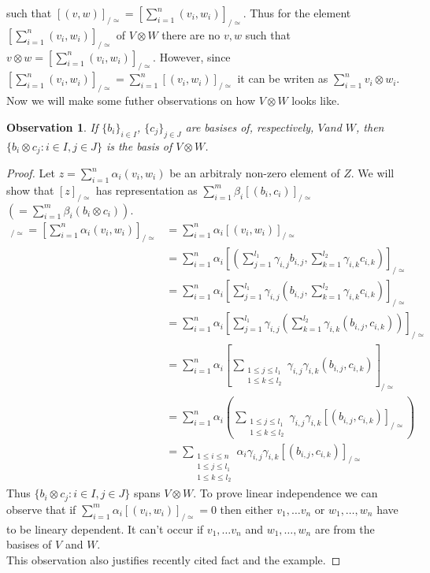 \documentclass[a4paper]{article}
\newtheorem{observation}{Observation}
\begin{document}
such that $ [(v,w)]_{/\simeq} = \left[\displaystyle\sum^n_{i=1}(v_i,w_i)\right]_{/\simeq}$.
Thus for the element $\left[\displaystyle\sum^n_{i=1}(v_i,w_i)\right]_{/\simeq}$ of $V\otimes W$
there are no $v, w$ such that $v \otimes w = \left[\displaystyle\sum^n_{i=1}(v_i,w_i)\right]_{/\simeq}$.
However, since $\left[\displaystyle\sum^n_{i=1}(v_i,w_i)\right]_{/\simeq} =
\displaystyle\sum^n_{i=1}[(v_i,w_i)]_{/\simeq}$ it can be writen as
$\displaystyle\sum^n_{i=1}v_i \otimes w_i$. \\
Now we will make some futher observations on how $V \otimes W$ looks like.
\begin{observation}
\label{observation:1}
If $\{b_i\}_{i \in I}$, $\{c_j\}_{j \in J}$ are basises of, respectively, $V$and $W$,
then $\{b_i \otimes c_j : i \in I, j \in J\}$ is the basis of $V \otimes W$.
\end{observation}
\begin{proof}
Let $z = \displaystyle\sum^n_{i = 1}\alpha_i(v_i,w_i)$ be an arbitraly non-zero element of $Z$. We will show
that $[z]_{/\simeq}$ has representation as $\displaystyle\sum^m_{i = 1}\beta_i [(b_i,c_i)]_{/\simeq}$
$\left(=\displaystyle\sum^m_{i = 1}\beta_i(b_i \otimes c_i)\right)$.
\begin{align*}
[z]_{/\simeq} = \left[\sum^n_{i = 1}\alpha_i(v_i,w_i)\right]_{/\simeq} &=
\sum^n_{i = 1}\alpha_i[(v_i,w_i)]_{/\simeq} \\
&= \sum^n_{i = 1}\alpha_i\left[\left(\sum^{l_1}_{j=1}\gamma_{i,j}b_{i,j},
\sum^{l_2}_{k=1}\gamma_{i,k}c_{i,k}\right)\right]_{/\simeq} \\
&= \sum^n_{i = 1}\alpha_i\left[\sum^{l_1}_{j=1}\gamma_{i,j}\left(b_{i,j},
\sum^{l_2}_{k=1}\gamma_{i,k}c_{i,k}\right)\right]_{/\simeq} \\
&= \sum^n_{i = 1}\alpha_i\left[\sum^{l_1}_{j=1}\gamma_{i,j}\left(\sum^{l_2}_{k=1}\gamma_{i,k}
\left(b_{i,j},c_{i,k}\right)\right)\right]_{/\simeq} \\
&= \sum^n_{i = 1}\alpha_i\left[\sum_{\substack{1 \leq j \leq l_1 \\ 1 \leq k \leq l_2}}
\gamma_{i,j}\gamma_{i,k}(b_{i,j}, c_{i,k})\right]_{/\simeq} \\
&= \sum^n_{i = 1}\alpha_i\left(\sum_{\substack{1 \leq j \leq l_1 \\ 1 \leq k \leq l_2}}
\gamma_{i,j}\gamma_{i,k}[(b_{i,j}, c_{i,k})]_{/\simeq}\right) \\
&= \sum_{\substack{1 \leq i \leq n \\1 \leq j \leq l_1 \\ 1 \leq k \leq l_2}}
\alpha_i\gamma_{i,j}\gamma_{i,k}[(b_{i,j}, c_{i,k})]_{/\simeq}
\end{align*}
Thus $\{b_i \otimes c_j : i \in I, j \in J\}$ spans $V \otimes W$. To prove linear independence we can observe
that if $\displaystyle\sum^m_{i = 1}\alpha_i [(v_i,w_i)]_{/\simeq} = 0$
then either $v_1, \dots v_n$ or $w_1, \dots, w_n$ have to be lineary dependent. It can't occur if
$v_1, \dots v_n$ and $w_1, \dots, w_n$ are from the basises of $V$ and $W$.\\
This observation also justifies
recently cited fact and the example.
\end{proof}
\end{document}

